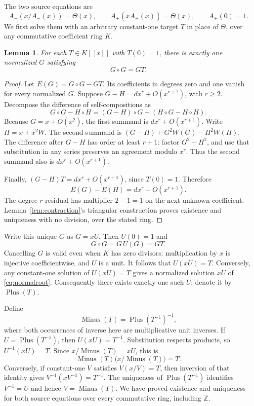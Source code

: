 \documentclass[11pt,a4paper]{article}
\newtheorem{lemma}[theorem]{Lemma}
\theoremstyle{remark}
\newcommand{\Z}{\mathbb Z}
\newcommand{\ps}[1]{#1[[x]]}
\newcommand{\Plus}{\operatorname{Plus}}
\newcommand{\Minus}{\operatorname{Minus}}
\begin{document}
The two source equations are
\begin{equation}\label{eq:thetaoriginal}
 A_-(x/A_-(x))=\Theta(x),\qquad
 A_+(xA_+(x))=\Theta(x),\qquad A_\pm(0)=1.
\end{equation}
We first solve them with an arbitrary constant-one target $T$ in place
of $\Theta$, over any commutative coefficient ring $K$.

\begin{lemma}\label{lem:normalroot}
For each $T\in\ps K$ with $T(0)=1$, there is exactly one normalized $G$
satisfying
\begin{equation}\label{eq:normalroot}
 G\circ G=GT.
\end{equation}
\end{lemma}

\begin{proof}
Let $E(G)=G\circ G-GT$. Its coefficients in degrees zero and one vanish
for every normalized $G$. Suppose $G-H=d x^r+O(x^{r+1})$, with $r\ge2$.
Decompose the difference of self-compositions as
\[
 G\circ G-H\circ H=(G-H)\circ G+(H\circ G-H\circ H).
\]
Because $G=x+O(x^2)$, the first summand is
$d x^r+O(x^{r+1})$. Write $H=x+x^2W$. The second summand is
$(G-H)+G^2W(G)-H^2W(H)$. The difference after $G-H$ has order at least
$r+1$: factor $G^2-H^2$, and use that substitution in any series
preserves an agreement modulo $x^r$. Thus the second summand also is
$d x^r+O(x^{r+1})$.

Finally, $(G-H)T=d x^r+O(x^{r+1})$, since $T(0)=1$. Therefore
\[
 E(G)-E(H)=d x^r+O(x^{r+1}).
\]
The degree-$r$ residual has multiplier $2-1=1$ on the next unknown
coefficient. Lemma~\ref{lem:contraction}'s triangular construction proves
existence and uniqueness with no division, over the stated ring.
\end{proof}

Write this unique $G$ as $G=xU$. Then $U(0)=1$ and
\[
 G\circ G=G\,U(G)=GT.
\]
Cancelling $G$ is valid even when $K$ has zero divisors: multiplication by
$x$ is injective coefficientwise, and $U$ is a unit. It follows that
$U(xU)=T$. Conversely, any constant-one solution of $U(xU)=T$ gives a
normalized solution $xU$ of \eqref{eq:normalroot}. Consequently there
exists exactly one such $U$; denote it by $\Plus(T)$.

Define
\[
 \Minus(T)=\Plus(T^{-1})^{-1},
\]
where both occurrences of inverse here are multiplicative unit inverses.
If $U=\Plus(T^{-1})$, then $U(xU)=T^{-1}$.
Substitution respects products, so $U^{-1}(xU)=T$. Since
$x/\Minus(T)=xU$, this is
\[
 \Minus(T)\bigl(x/\Minus(T)\bigr)=T.
\]
Conversely, if constant-one $V$ satisfies $V(x/V)=T$, then inversion of
that identity gives $V^{-1}(xV^{-1})=T^{-1}$. The uniqueness of
$\Plus(T^{-1})$ identifies $V^{-1}=U$ and hence $V=\Minus(T)$.
We have proved existence and uniqueness for both source equations
over every commutative ring, including $\Z$.
\end{document}
